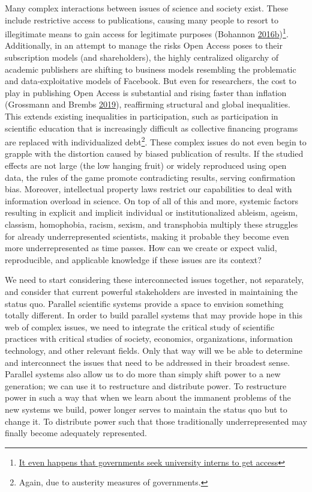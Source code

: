 \documentclass[a5paper]{book}
\let\rmarkdownfootnote\footnote%
\def\footnote{\protect\rmarkdownfootnote}
\begin{document}
Many complex interactions between issues of science and society exist.
These include restrictive access to publications, causing many people to
resort to illegitimate means to gain access for legitimate purposes
(Bohannon
\protect\hyperlink{ref-doi:10.1126ux2fscience.352.6285.508}{2016}\protect\hyperlink{ref-doi:10.1126ux2fscience.352.6285.508}{b})\footnote{\href{https://therostrumblog.wordpress.com/2015/01/12/why-all-phd-students-should-do-a-policy-placement/}{It
  even happens that governments seek university interns to get access}}.
Additionally, in an attempt to manage the risks Open Access poses to
their subscription models (and shareholders), the highly centralized
oligarchy of academic publishers are shifting to business models
resembling the problematic and data-exploitative models of Facebook. But
even for researchers, the cost to play in publishing Open Access is
substantial and rising faster than inflation (Grossmann and Brembs
\protect\hyperlink{ref-doi:10.7287ux2fpeerj.preprints.27809v1}{2019}),
reaffirming structural and global inequalities. This extends existing
inequalities in participation, such as participation in scientific
education that is increasingly difficult as collective financing
programs are replaced with individualized debt\footnote{Again, due to
  austerity measures of governments.}. These complex issues do not even
begin to grapple with the distortion caused by biased publication of
results. If the studied effects are not large (the low hanging fruit) or
widely reproduced using open data, the rules of the game promote
contradicting results, serving confirmation bias. Moreover, intellectual
property laws restrict our capabilities to deal with information
overload in science. On top of all of this and more, systemic factors
resulting in explicit and implicit individual or institutionalized
ableism, ageism, classism, homophobia, racism, sexism, and transphobia
multiply these struggles for already underrepresented scientists, making
it probable they become even more underrepresented as time passes. How
can we create or expect valid, reproducible, and applicable knowledge if
these issues are its context?

We need to start considering these interconnected issues together, not
separately, and consider that current powerful stakeholders are invested
in maintaining the status quo. Parallel scientific systems provide a
space to envision something totally different. In order to build
parallel systems that may provide hope in this web of complex issues, we
need to integrate the critical study of scientific practices with
critical studies of society, economics, organizations, information
technology, and other relevant fields. Only that way will we be able to
determine and interconnect the issues that need to be addressed in their
broadest sense. Parallel systems also allow us to do more than simply
shift power to a new generation; we can use it to restructure and
distribute power. To restructure power in such a way that when we learn
about the immanent problems of the new systems we build, power longer
serves to maintain the status quo but to change it. To distribute power
such that those traditionally underrepresented may finally become
adequately represented.
\end{document}
